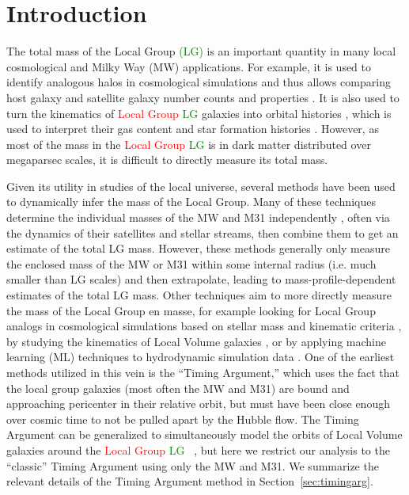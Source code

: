 \documentclass[twocolumn]{aastex631}
\newcommand{\remove}[1]{\textcolor{red}{#1}}
\newcommand{\add}[1]{\textcolor{green}{#1}}
\begin{document}
\section{Introduction}
\label{sec:intro}
The total mass of the Local Group \add{(LG)} is an important quantity in many
local cosmological and Milky Way (MW) applications.
For example, it is used to identify analogous halos in cosmological simulations
and thus allows comparing host galaxy and satellite galaxy number counts and
properties \citep[e.g.,][]{Patel2017a, Marinacci:2017, Dooley2017, Besla2018,
Patel2018, Garrison-Kimmel:2019a, Garrison-Kimmel:2019b, Sawala2022}.
It is also used to turn the kinematics of \remove{Local Group} \add{LG}
galaxies into orbital histories \citep[e.g.,][]{Peebles:2017}, which is used to
interpret their gas content \citep[e.g.,][]{Fillingham:2018,Putman:2021} and
star formation histories \citep[e.g.,][]{Tolstoy:2009}.
However, as most of the mass in the \remove{Local Group} \add{LG} is in dark
matter distributed over megaparsec scales, it is difficult to directly measure
its total mass.

Given its utility in studies of the local universe, several methods have been
used to dynamically infer the mass of the Local Group.
Many of these techniques determine the individual masses of the MW and M31
independently \citep[e.g.][]{Watkins2010, Fardal2013,Diaz2014,Carlesi2017,
Patel2018, Eadie:2019, Fritz:2020, Deason:2021, Villanueva-Domingo2021,
Wang:2022}, often via the dynamics of their satellites
and stellar streams, then combine them to get an estimate of the total LG mass.
However, these methods generally only measure the enclosed mass of the MW or M31
within some internal radius (i.e. much smaller than LG scales) and then
extrapolate, leading to mass-profile-dependent estimates of the total LG mass.
Other techniques aim to more directly measure the mass of the Local Group en
masse, for example looking for Local Group analogs in cosmological simulations
based on stellar mass and kinematic criteria
\citep[e.g.,][]{LiWhite2008, Gonzalez2014, Hartl2021, Zhai2020},
by studying the kinematics of Local Volume galaxies
\citep[e.g.,][]{Diaz2014,Penarrubia2014}, or by applying machine learning (ML)
techniques to hydrodynamic simulation data
\citep[e.g.,][]{McLeod2017,Villanueva-Domingo2021}.
One of the earliest methods utilized in this vein is the ``Timing Argument,''
which uses the fact that the local group galaxies (most often the MW and M31)
are bound and approaching pericenter in their relative orbit, but must have been
close enough over cosmic time to not be pulled apart by the Hubble flow.
The Timing Argument can be generalized to simultaneously model the orbits of
Local Volume galaxies around the \remove{Local Group} \add{LG}
~\citep{Penarrubia2016, Penarrubia2017}, but here we restrict our analysis to
the ``classic'' Timing Argument using only the MW and M31.
We summarize the relevant details of the Timing Argument method in
Section~\ref{sec:timingarg}.
\end{document}
